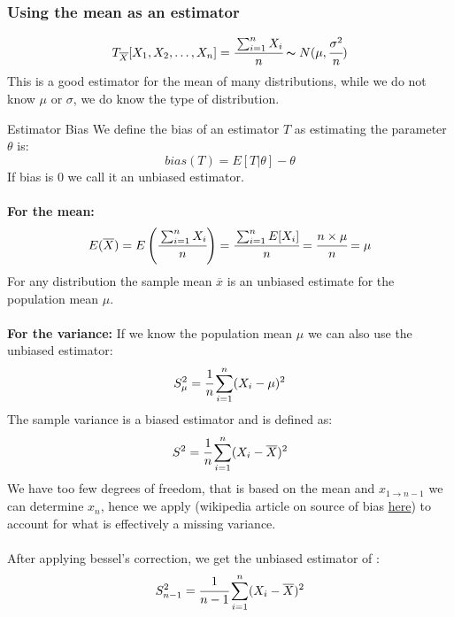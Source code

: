 \subsubsection*{Using the mean as an estimator}
\[T_{\overline{X}}[X_1, X_2, \dots , X_n] = \cfrac{\sum_{i = 1}^nX_i}{n} \thicksim N(\mu, \cfrac{\sigma^2}{n})\]
This is a good estimator for the mean of many distributions, while we do not know $\mu$ or $\sigma$, we do know the type of distribution.

\begin{definitionbox}{Estimator Bias}
We define the bias of an estimator $T$ as estimating the parameter $\theta$ is:
\[bias(T) = E[T | \theta] - \theta\]
If bias is $0$ we call it an unbiased estimator.
\\
\\ \textbf{For the mean:}
\[E(\overline{X}) = E \left( \cfrac{\sum_{i=1}^nX_i}{n} \right) = \cfrac{\sum_{i=1}^nE[X_i]}{n} = \cfrac{n \times \mu}{n} = \mu\]
For any distribution the sample mean $\overline{x}$ is an unbiased estimate for the population mean $\mu$.
\\
\\ \textbf{For the variance:}
If we know the population mean $\mu$ we can also use the unbiased estimator:
\[S_\mu^2 = \cfrac{1}{n}\sum_{i=1}^n(X_i - \mu)^2\]
The sample variance is a biased estimator and is defined as:
\[S^2 = \cfrac{1}{n}\sum_{i=1}^n(X_i - \overline{X})^2\]
We have too few degrees of freedom, that is based on the mean and $x_{1 \to n-1}$ we can determine $x_n$, hence we apply  (wikipedia article on source of bias \href{https://en.wikipedia.org/wiki/Bessel\%27s_correction}{here}) to account for what is effectively a missing variance.
\\
\\ After applying bessel's correction, we get the unbiased estimator of :
\[S_{n-1}^2 = \cfrac{1}{n - 1}\sum_{i=1}^n(X_i - \overline{X})^2\]
\end{definitionbox}

